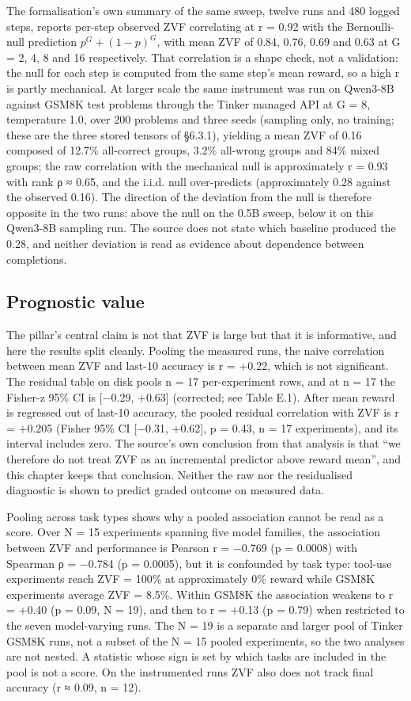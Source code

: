 \documentclass[12pt,a4paper]{report}
\begin{document}
The formalisation's own summary of the same sweep, twelve runs and 480
logged steps, reports per-step observed ZVF correlating at r = 0.92 with
the Bernoulli-null prediction \(p^G + (1-p)^G\), with mean ZVF of 0.84,
0.76, 0.69 and 0.63 at G = 2, 4, 8 and 16 respectively. That correlation
is a shape check, not a validation: the null for each step is computed
from the same step's mean reward, so a high r is partly mechanical. At
larger scale the same instrument was run on Qwen3-8B against GSM8K test
problems through the Tinker managed API at G = 8, temperature 1.0, over
200 problems and three seeds (sampling only, no training; these are the
three stored tensors of §6.3.1), yielding a mean ZVF of 0.16 composed of
12.7\% all-correct groups, 3.2\% all-wrong groups and 84\% mixed groups;
the raw correlation with the mechanical null is approximately r = 0.93
with rank ρ ≈ 0.65, and the i.i.d. null over-predicts (approximately
0.28 against the observed 0.16). The direction of the deviation from the
null is therefore opposite in the two runs: above the null on the 0.5B
sweep, below it on this Qwen3-8B sampling run. The source does not state
which baseline produced the 0.28, and neither deviation is read as
evidence about dependence between completions.

\subsection{Prognostic value}\label{prognostic-value}

The pillar's central claim is not that ZVF is large but that it is
informative, and here the results split cleanly. Pooling the measured
runs, the naive correlation between mean ZVF and last-10 accuracy is r =
+0.22, which is not significant. The residual table on disk pools n = 17
per-experiment rows, and at n = 17 the Fisher-z 95\% CI is {[}−0.29,
+0.63{]} (corrected; see Table E.1). After mean reward is regressed out
of last-10 accuracy, the pooled residual correlation with ZVF is r =
+0.205 (Fisher 95\% CI {[}−0.31, +0.62{]}, p = 0.43, n = 17
experiments), and its interval includes zero. The source's own
conclusion from that analysis is that ``we therefore do not treat ZVF as
an incremental predictor above reward mean'', and this chapter keeps
that conclusion. Neither the raw nor the residualised diagnostic is
shown to predict graded outcome on measured data.

Pooling across task types shows why a pooled association cannot be read
as a score. Over N = 15 experiments spanning five model families, the
association between ZVF and performance is Pearson r = −0.769 (p =
0.0008) with Spearman ρ = −0.784 (p = 0.0005), but it is confounded by
task type: tool-use experiments reach ZVF = 100\% at approximately 0\%
reward while GSM8K experiments average ZVF = 8.5\%. Within GSM8K the
association weakens to r = +0.40 (p = 0.09, N = 19), and then to r =
+0.13 (p = 0.79) when restricted to the seven model-varying runs. The N
= 19 is a separate and larger pool of Tinker GSM8K runs, not a subset of
the N = 15 pooled experiments, so the two analyses are not nested. A
statistic whose sign is set by which tasks are included in the pool is
not a score. On the instrumented runs ZVF also does not track final
accuracy (r ≈ 0.09, n = 12).
\end{document}

